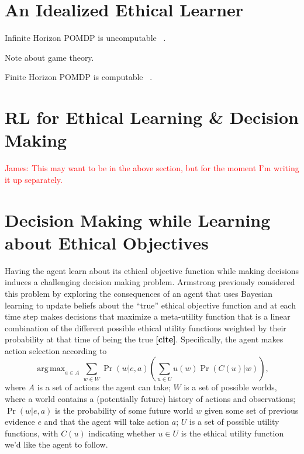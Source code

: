 \documentclass[11pt]{article}
\newcommand\jmnote[1]{\textcolor{red}{James: #1}}
\newcommand\ncite{\textcolor{black}{{\bf [cite]}}}
\DeclareMathOperator*{\argmax}{arg\,max}
\begin{document}
\section{An Idealized Ethical Learner}

Infinite Horizon POMDP is uncomputable ~\cite{madani1999undecidability}.

Note about game theory.

Finite Horizon POMDP is computable ~\cite{mundhenk2000complexity}.




\section{RL for Ethical Learning \& Decision Making}

\jmnote{This may want to be in the above section, but for the moment I'm writing it up separately.}
\section{Decision Making while Learning about Ethical Objectives}
Having the agent learn about its ethical objective function while making decisions induces a challenging decision making problem. Armstrong previously considered this problem by exploring the consequences of an agent that uses Bayesian learning to update beliefs about the ``true'' ethical objective function and at each time step makes decisions that maximize a meta-utility function that is a linear combination of the different possible ethical utility functions weighted by their probability at that time of being the true \ncite. Specifically, the agent makes action selection according to
\begin{equation}
\label{eq:armstrong}
\argmax_{a \in A} \sum_{w \in W} \Pr(w | e, a) \left( \sum_{u \in U} u(w) \Pr(C(u)|w) \right),
\end{equation}
where $A$ is a set of actions the agent can take; $W$ is a set of possible worlds, where a world contains a (potentially future) history of actions and observations; $\Pr(w | e, a)$ is the probability of some future world $w$ given some set of previous evidence $e$ and that the agent will take action $a$; $U$ is a set of possible utility functions, with $C(u)$ indicating whether $u \in U$ is the ethical utility function we'd like the agent to follow.
\end{document}
